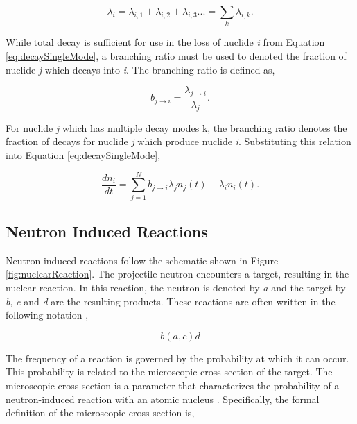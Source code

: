 \clearpage

\begin{equation}
    \lambda_{i} = \lambda_{i,1} + \lambda_{i,2} + \lambda_{i,3} ... = \sum_{k} \lambda_{i,k}.
\end{equation}

\noindent While total decay is sufficient for use in the loss of nuclide \textit{i} from Equation \ref{eq:decaySingleMode}, a branching ratio must be used to denoted the fraction of nuclide \textit{j} which decays into \textit{i}. The branching ratio is defined as,

\begin{equation}
    b_{j\rightarrow i} = \frac{\lambda_{j\rightarrow i}}{\lambda_{j}}.
\end{equation}

\noindent For nuclide \textit{j} which has multiple decay modes k, the branching ratio denotes the fraction of decays for nuclide \textit{j} which produce nuclide \textit{i}. Substituting this relation into Equation \ref{eq:decaySingleMode},

\begin{equation}
    \frac{dn_{i}}{dt} = \sum_{j=1}^{N} b_{j\rightarrow i}\lambda_{j}n_{j}(t) -\lambda_{i} n_{i}(t).
    \label{eq:decay}
\end{equation}




\subsection{Neutron Induced Reactions}
Neutron induced reactions follow the schematic shown in Figure \ref{fig:nuclearReaction}.  The projectile neutron encounters a target, resulting in the nuclear reaction. In this reaction, the neutron is denoted by \textit{a} and the target by \textit{b}, \textit{c} and \textit{d} are the resulting products. These reactions are often written in the following notation \cite{duderstadt1976},

\begin{equation*}
    b (a,c) d 
\end{equation*}



The frequency of a reaction is governed by the probability at which it can occur. This probability is related to the microscopic cross section of the target. The microscopic cross section is a parameter that characterizes the probability of a neutron-induced reaction with an atomic nucleus \cite{duderstadt1976}. Specifically, the formal definition of the microscopic cross section is,

